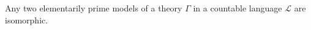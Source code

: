 Any two elementarily prime models of a theory $\Gamma$ in a countable language $\mathcal{L}$ are isomorphic.
